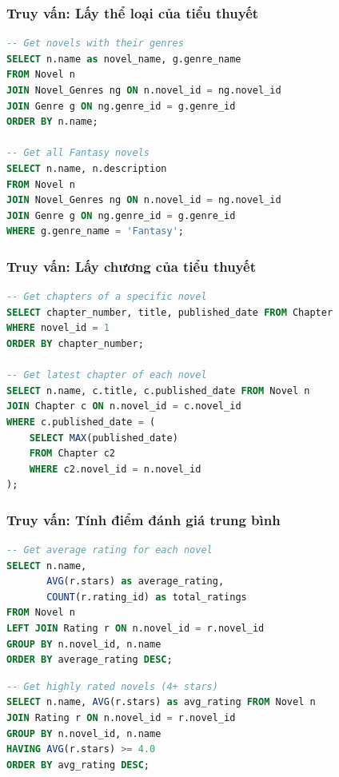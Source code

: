 \documentclass[12pt,aspectratio=169,handout]{beamer}
\begin{document}
\begin{frame}[fragile]
\frametitle{Truy vấn: Lấy thể loại của tiểu thuyết}
\begin{lstlisting}[language=SQL, basicstyle=\small\ttfamily]
-- Get novels with their genres
SELECT n.name as novel_name, g.genre_name 
FROM Novel n
JOIN Novel_Genres ng ON n.novel_id = ng.novel_id
JOIN Genre g ON ng.genre_id = g.genre_id
ORDER BY n.name;

-- Get all Fantasy novels
SELECT n.name, n.description
FROM Novel n
JOIN Novel_Genres ng ON n.novel_id = ng.novel_id
JOIN Genre g ON ng.genre_id = g.genre_id
WHERE g.genre_name = 'Fantasy';
\end{lstlisting}
\end{frame}

\begin{frame}[fragile]
\frametitle{Truy vấn: Lấy chương của tiểu thuyết}
\begin{lstlisting}[language=SQL, basicstyle=\small\ttfamily]
-- Get chapters of a specific novel
SELECT chapter_number, title, published_date FROM Chapter 
WHERE novel_id = 1 
ORDER BY chapter_number;

-- Get latest chapter of each novel
SELECT n.name, c.title, c.published_date FROM Novel n
JOIN Chapter c ON n.novel_id = c.novel_id
WHERE c.published_date = (
    SELECT MAX(published_date) 
    FROM Chapter c2 
    WHERE c2.novel_id = n.novel_id
);
\end{lstlisting}
\end{frame}

\begin{frame}
\frametitle{Truy vấn: Tính điểm đánh giá trung bình}
\begin{lstlisting}[language=SQL, basicstyle=\small\ttfamily]
-- Get average rating for each novel
SELECT n.name, 
       AVG(r.stars) as average_rating, 
       COUNT(r.rating_id) as total_ratings
FROM Novel n
LEFT JOIN Rating r ON n.novel_id = r.novel_id
GROUP BY n.novel_id, n.name
ORDER BY average_rating DESC;
\end{lstlisting}

\framebreak

\begin{lstlisting}[language=SQL, basicstyle=\small\ttfamily]
-- Get highly rated novels (4+ stars)
SELECT n.name, AVG(r.stars) as avg_rating FROM Novel n
JOIN Rating r ON n.novel_id = r.novel_id
GROUP BY n.novel_id, n.name
HAVING AVG(r.stars) >= 4.0
ORDER BY avg_rating DESC;
\end{lstlisting}
\end{frame}
\end{document}
